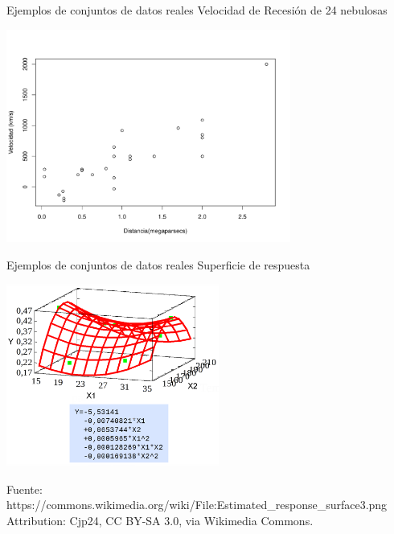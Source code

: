 \documentclass[aspectratio=169]{beamer}
\begin{document}
 \begin{frame}{Ejemplos de conjuntos de datos reales}
{\scriptsize Velocidad de Recesión de 24 nebulosas}
\vspace{-1cm}\begin{center}
    \includegraphics[height=7cm]{hubble}
  \end{center}
   
 \end{frame}
 \begin{frame}{Ejemplos de conjuntos de datos reales}
{\scriptsize Superficie de respuesta}
\vspace{-1cm}\begin{center}
  \includegraphics[height=6cm]{response_surface}

  {\tiny Fuente:
     https://commons.wikimedia.org/wiki/File:Estimated\_response\_surface3.png
  Attribution: Cjp24, CC BY-SA 3.0, via Wikimedia
  Commons.
  }
  \end{center}
   
\end{frame}
\end{document}
